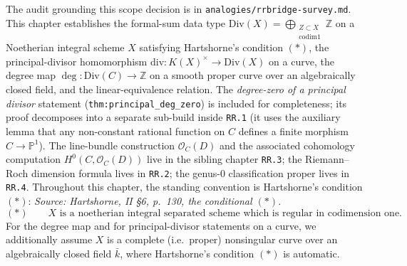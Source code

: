 The audit grounding this scope decision is in
\texttt{analogies/rrbridge-survey.md}.
This chapter establishes the formal-sum data type
\(\mathrm{Div}(X) = \bigoplus_{\substack{Z \subset X \\ \mathrm{codim} 1}} \mathbb Z\) on a
Noetherian integral scheme \(X\) satisfying Hartshorne's condition \((*)\), the
principal-divisor homomorphism \(\mathrm{div} \colon K(X)^{\times} \to \mathrm{Div}(X)\) on a
curve, the degree map \(\deg \colon \mathrm{Div}(C) \to \mathbb Z\) on a smooth proper
curve over an algebraically closed field, and the linear-equivalence
relation. The \emph{degree-zero of a principal divisor} statement
(\texttt{thm:principal_deg_zero}) is included for completeness; its proof
decomposes into a separate sub-build inside \texttt{RR.1} (it uses the
auxiliary lemma that any non-constant rational function on \(C\) defines a
finite morphism \(C \to \mathbb P^1\)). The line-bundle construction $\mathcal
O_C(D)$ and the associated cohomology computation $H^0(C, \mathcal O_C(D))$
live in the sibling chapter \texttt{RR.3}; the Riemann--Roch dimension
formula lives in \texttt{RR.2}; the genus-\(0\) classification proper lives in
\texttt{RR.4}.
Throughout this chapter, the standing convention is Hartshorne's condition
\((*)\):
\textit{Source: Hartshorne, II \S6, p.~130, the conditional \((*)\).}
\[
  (\ast)\qquad
  X \text{ is a noetherian integral separated scheme which is regular in
  codimension one.}
\]
For the degree map and for principal-divisor statements on a curve, we
additionally assume \(X\) is a complete (i.e.\ proper) nonsingular curve over
an algebraically closed field \(\bar k\), where Hartshorne's condition \((*)\) is
automatic.
